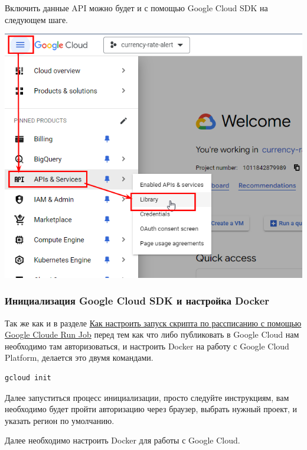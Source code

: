 \documentclass[
]{book}
\begin{document}
Включить данные API можно будет и с помощью Google Cloud SDK на следующем шаге.

\includegraphics{img/9-1.png}

\subsubsection{Инициализация Google Cloud SDK и настройка Docker}\label{ux438ux43dux438ux446ux438ux430ux43bux438ux437ux430ux446ux438ux44f-google-cloud-sdk-ux438-ux43dux430ux441ux442ux440ux43eux439ux43aux430-docker}

Так же как и в разделе \hyperref[ux43aux430ux43a-ux43dux430ux441ux442ux440ux43eux438ux442ux44c-ux437ux430ux43fux443ux441ux43a-ux441ux43aux440ux438ux43fux442ux430-ux43fux43e-ux440ux430ux441ux441ux43fux438ux441ux430ux43dux438ux44e-ux441-ux43fux43eux43cux43eux449ux44cux44e-google-cloude-run-job]{Как настроить запуск скрипта по рассписанию с помощью Google Cloude Run Job} перед тем как что либо публиковать в Google Cloud нам необходимо там авторизоваться, и настроить Docker на работу с Google Cloud Platform, делается это двумя командами.

\begin{verbatim}
gcloud init
\end{verbatim}

Далее запуститься процесс инициализации, просто следуйте инструкциям, вам необходимо будет пройти авторизацию через браузер, выбрать нужный проект, и указать регион по умолчанию.

Далее необходимо настроить Docker для работы с Google Cloud.
\end{document}
